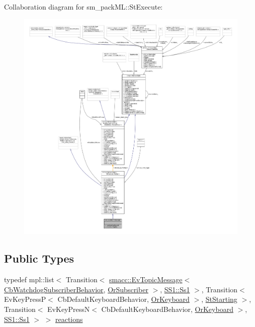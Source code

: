 Collaboration diagram for sm\+\_\+pack\+ML\+:\+:St\+Execute\+:
\nopagebreak
\begin{figure}[H]
\begin{center}
\leavevmode
\includegraphics[width=350pt]{structsm__packML_1_1StExecute__coll__graph}
\end{center}
\end{figure}
\subsection*{Public Types}
\begin{DoxyCompactItemize}
\item 
typedef mpl\+::list$<$ Transition$<$ \hyperlink{structsmacc_1_1default__events_1_1EvTopicMessage}{smacc\+::\+Ev\+Topic\+Message}$<$ \hyperlink{classsm__packML_1_1cl__subscriber_1_1CbWatchdogSubscriberBehavior}{Cb\+Watchdog\+Subscriber\+Behavior}, \hyperlink{classsm__packML_1_1OrSubscriber}{Or\+Subscriber} $>$, \hyperlink{structsm__packML_1_1SS1_1_1Ss1}{S\+S1\+::\+Ss1} $>$, Transition$<$ Ev\+Key\+PressP$<$ Cb\+Default\+Keyboard\+Behavior, \hyperlink{classsm__packML_1_1OrKeyboard}{Or\+Keyboard} $>$, \hyperlink{structsm__packML_1_1StStarting}{St\+Starting} $>$, Transition$<$ Ev\+Key\+PressN$<$ Cb\+Default\+Keyboard\+Behavior, \hyperlink{classsm__packML_1_1OrKeyboard}{Or\+Keyboard} $>$, \hyperlink{structsm__packML_1_1SS1_1_1Ss1}{S\+S1\+::\+Ss1} $>$ $>$ \hyperlink{structsm__packML_1_1StExecute_af23c5d6482c96a3b11339c6b98a1ef8c}{reactions}
\end{DoxyCompactItemize}
